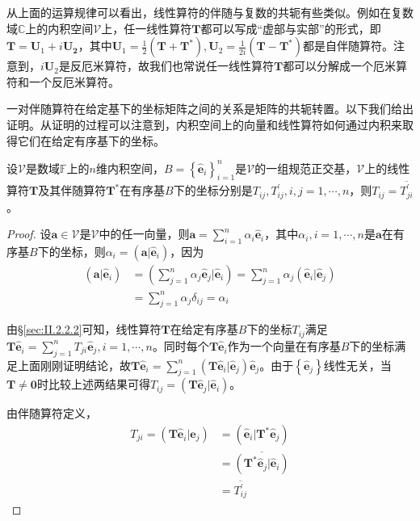 \documentclass[main.tex]{subfiles}
\begin{document}
从上面的运算规律可以看出，线性算符的伴随与复数的共轭有些类似。例如在复数域$\mathbb{C}$上的内积空间$\mathcal{V}$上，任一线性算符$\mathbf{T}$都可以写成“虚部与实部”的形式，即$\mathbf{T}=\mathbf{U}_1+i\mathbf{U_2}$，其中$\mathbf{U}_1=\frac{1}{2}\left(\mathbf{T}+\mathbf{T}^*\right),\mathbf{U}_2=\frac{1}{2i}\left(\mathbf{T}-\mathbf{T}^*\right)$都是自伴随算符。注意到，$i\mathbf{U}_2$是反厄米算符，故我们也常说任一线性算符$\mathbf{T}$都可以分解成一个厄米算符和一个反厄米算符。

一对伴随算符在给定基下的坐标矩阵之间的关系是矩阵的共轭转置。以下我们给出证明。从证明的过程可以注意到，内积空间上的向量和线性算符如何通过内积来取得它们在给定有序基下的坐标。

\begin{theorem}\label{thm:II.2.31}
    设$\mathcal{V}$是数域$\mathbb{F}$上的$n$维内积空间，$B=\left\{\mathbf{\hat{e}}_i\right\}_{i=1}^n$是$\mathcal{V}$的一组规范正交基，$\mathcal{V}$上的线性算符$\mathbf{T}$及其伴随算符$\mathbf{T}^*$在有序基$B$下的坐标分别是$T_{ij},T^\prime_{ij},i,j=1,\cdots,n$，则$T_{ij}=\overline{T^\prime_{ji}}$。
\end{theorem}
\begin{proof}
    设$\mathbf{a}\in\mathcal{V}$是$\mathcal{V}$中的任一向量，则$\mathbf{a}=\sum_{i=1}^n\alpha_i\mathbf{\hat{e}}_i$，其中$\alpha_i,i=1,\cdots,n$是$\mathbf{a}$在有序基$B$下的坐标，则$\alpha_i=\left(\mathbf{a}|\mathbf{\hat{e}}_i\right)$，因为
    \begin{align*}
        \left(\mathbf{a}|\mathbf{\hat{e}}_i\right) & =\left(\sum_{j=1}^n\alpha_j\mathbf{\hat{e}}_j|\mathbf{\hat{e}}_i\right)=\sum_{j=1}^n\alpha_j\left(\mathbf{\hat{e}}_i|\mathbf{\hat{e}}_j\right)
        \\&=\sum_{j=1}^n\alpha_j\delta_{ij}=\alpha_i
    \end{align*}

    由\S\ref{sec:II.2.2.2}可知，线性算符$\mathbf{T}$在给定有序基$B$下的坐标$T_{ij}$满足$\mathbf{T\hat{e}}_i=\sum_{j=1}^nT_{ji}\mathbf{\hat{e}}_j,i=1,\cdots,n$。同时每个$\mathbf{T\hat{e}}_i$作为一个向量在有序基$B$下的坐标满足上面刚刚证明结论，故$\mathbf{T\hat{e}}_i=\sum_{j=1}^n\left(\mathbf{T\hat{e}}_i|\mathbf{\hat{e}}_j\right)\mathbf{\hat{e}}_j$。由于$\left\{\mathbf{\hat{e}}_j\right\}$线性无关，当$\mathbf{T}\neq\mathbf{0}$时比较上述两结果可得$T_{ij}=\left(\mathbf{T\hat{e}}_j|\mathbf{\hat{e}}_i\right)$。

    由伴随算符定义，
    \begin{align*}
        T_{ji}=\left(\mathbf{T\hat{e}}_i|\mathbf{\hat{e}}_j\right) & =\left(\mathbf{\hat{e}}_i|\mathbf{T}^*\mathbf{\hat{e}}_j\right)            \\
                                                                   & =\overline{\left(\mathbf{T}^*\mathbf{\hat{e}}_j|\mathbf{\hat{e}}_i\right)} \\
                                                                   & =\overline{T^\prime_{ij}}
    \end{align*}
\end{proof}
\end{document}
